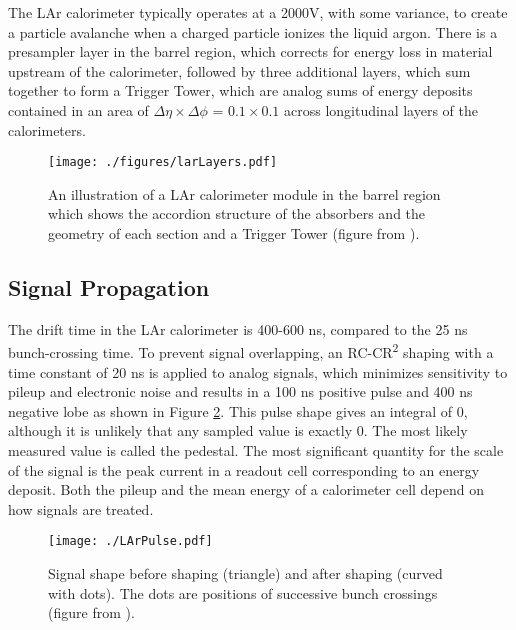 The LAr calorimeter typically operates at a 2000V, with some variance, to create a particle avalanche when a charged particle ionizes the liquid argon.  There is a presampler layer in the barrel region, which corrects for energy loss in material upstream of the calorimeter, followed by three additional layers, which sum together to form a Trigger Tower, which are analog sums of energy deposits contained in an area of $\Delta\eta \times \Delta\phi$ = $0.1 \times 0.1$ across longitudinal layers of the calorimeters.\\

\begin{figure}[h!]
  \centering
	\texttt{[image: ./figures/larLayers.pdf]}
\caption[An illustration of a LAr calorimeter module in the barrel region]{\label{fig:larLayout}{ An illustration of a LAr calorimeter module in the barrel region which shows the accordion structure of the absorbers and the geometry of each section and a Trigger Tower (figure from \cite{LArTDR}).}} %
\end{figure}


\subsection{Signal Propagation}
The drift time in the LAr calorimeter is 400-600 ns, compared to the 25 ns bunch-crossing time.  To prevent signal overlapping, an RC-CR\textsuperscript{2} shaping with a time constant of 20 ns is applied to analog signals, which minimizes sensitivity to pileup and electronic noise and results in a 100 ns positive pulse and 400 ns negative lobe as shown in Figure \ref{fig:larPulse}.  This pulse shape gives an integral of 0, although it is unlikely that any sampled value is exactly 0.  The most likely measured value is called the pedestal.  The most significant quantity for the scale of the signal is the peak current in a readout cell corresponding to an energy deposit.  Both the pileup and the mean energy of a calorimeter cell depend on how signals are treated.\\

\begin{figure}[h!]
  \centering
	\texttt{[image: ./LArPulse.pdf]}
\caption[Signal shape before and after shaping]{\label{fig:larPulse}{ Signal shape before shaping (triangle) and after shaping (curved with dots).  The dots are positions of successive bunch crossings (figure from \cite{DetectorPaper:2008}). }} 
\end{figure}


